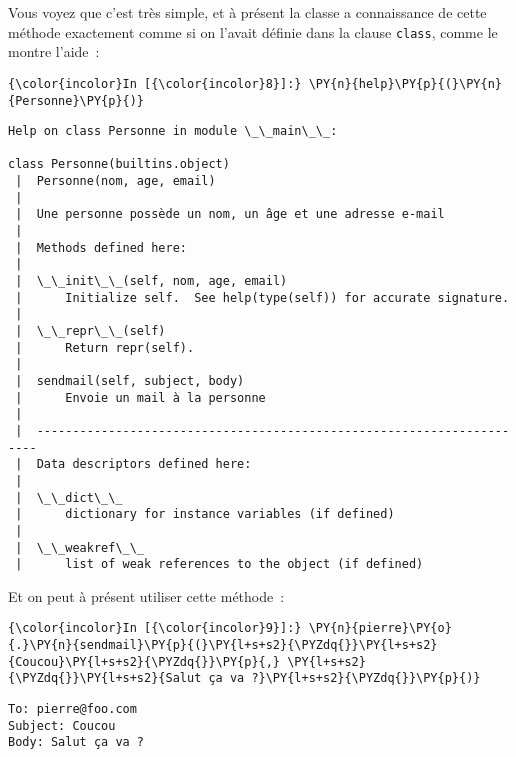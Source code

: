 Vous voyez que c'est très simple, et à présent la classe a connaissance
de cette méthode exactement comme si on l'avait définie dans la clause
\texttt{class}, comme le montre l'aide~:

    \begin{Verbatim}[commandchars=\\\{\},frame=single,framerule=0.3mm,rulecolor=\color{cellframecolor}]
{\color{incolor}In [{\color{incolor}8}]:} \PY{n}{help}\PY{p}{(}\PY{n}{Personne}\PY{p}{)}
\end{Verbatim}


    \begin{Verbatim}[commandchars=\\\{\},frame=single,framerule=0.3mm,rulecolor=\color{cellframecolor}]
Help on class Personne in module \_\_main\_\_:

class Personne(builtins.object)
 |  Personne(nom, age, email)
 |  
 |  Une personne possède un nom, un âge et une adresse e-mail
 |  
 |  Methods defined here:
 |  
 |  \_\_init\_\_(self, nom, age, email)
 |      Initialize self.  See help(type(self)) for accurate signature.
 |  
 |  \_\_repr\_\_(self)
 |      Return repr(self).
 |  
 |  sendmail(self, subject, body)
 |      Envoie un mail à la personne
 |  
 |  ----------------------------------------------------------------------
 |  Data descriptors defined here:
 |  
 |  \_\_dict\_\_
 |      dictionary for instance variables (if defined)
 |  
 |  \_\_weakref\_\_
 |      list of weak references to the object (if defined)
\end{Verbatim}

    Et on peut à présent utiliser cette méthode~:

    \begin{Verbatim}[commandchars=\\\{\},frame=single,framerule=0.3mm,rulecolor=\color{cellframecolor}]
{\color{incolor}In [{\color{incolor}9}]:} \PY{n}{pierre}\PY{o}{.}\PY{n}{sendmail}\PY{p}{(}\PY{l+s+s2}{\PYZdq{}}\PY{l+s+s2}{Coucou}\PY{l+s+s2}{\PYZdq{}}\PY{p}{,} \PY{l+s+s2}{\PYZdq{}}\PY{l+s+s2}{Salut ça va ?}\PY{l+s+s2}{\PYZdq{}}\PY{p}{)}
\end{Verbatim}


    \begin{Verbatim}[commandchars=\\\{\},frame=single,framerule=0.3mm,rulecolor=\color{cellframecolor}]
To: pierre@foo.com
Subject: Coucou
Body: Salut ça va ?
\end{Verbatim}


    
    
    
